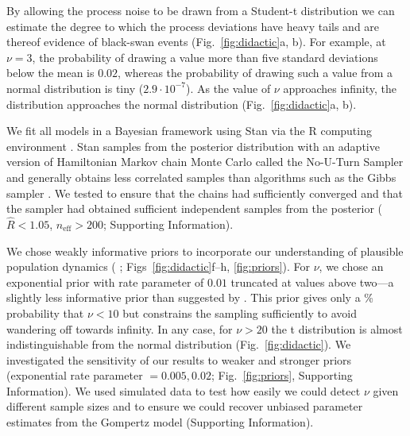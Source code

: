 By allowing the process noise to be drawn from a Student-t distribution we can
estimate the degree to which the process deviations have heavy tails and are
thereof evidence of black-swan events (Fig.~\ref{fig:didactic}a, b). For
example, at $\nu = 3$, the probability of drawing a value more than five
standard deviations below the mean is $0.02$, whereas the probability of
drawing such a value from a normal distribution is tiny ($2.9\cdot10^{-7}$). As
the value of $\nu$ approaches infinity, the distribution approaches the normal
distribution (Fig.~\ref{fig:didactic}a, b).

We fit all models in a Bayesian framework using Stan \citep{stan-manual2014}
via the R computing environment \citep{r2014}. Stan samples from the posterior
distribution with an adaptive version of Hamiltonian Markov chain Monte Carlo
called the No-U-Turn Sampler and generally obtains less correlated samples
than algorithms such as the Gibbs sampler \citep{hoffman2014}. We tested to
ensure that the chains had sufficiently converged and that the sampler had
obtained sufficient independent samples from the posterior ($\widehat{R} <
1.05$, $n_\mathrm{eff} > 200$; Supporting Information).

We chose weakly informative priors to incorporate our understanding of
plausible population dynamics (\citeauthor{gelman2014} \citeyear{gelman2014};
Figs~\ref{fig:didactic}f--h, \ref{fig:priors}). For $\nu$, we chose an
exponential prior with rate parameter of $0.01$ truncated at values above
two---a slightly less informative prior than suggested by
\citet{fernandez1998}. This prior gives only a \basePriorProbHeavy \%
probability that $\nu < 10$ but constrains the sampling sufficiently to avoid
wandering off towards infinity. In any case, for $\nu > 20$ the t distribution
is almost indistinguishable from the normal distribution
(Fig.~\ref{fig:didactic}). We investigated the sensitivity of our results to
weaker and stronger priors (exponential rate parameter $= 0.005, 0.02$;
Fig.~\ref{fig:priors}, Supporting Information). We used simulated data to test
how easily we could detect $\nu$ given different sample sizes and to ensure we
could recover unbiased parameter estimates from the Gompertz model (Supporting
Information).

